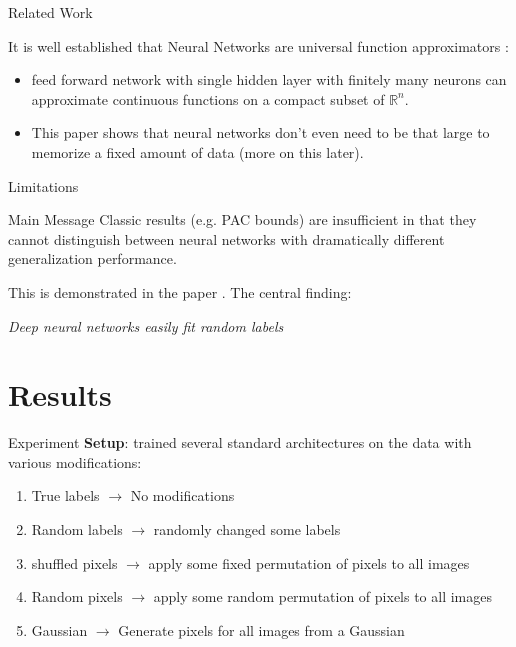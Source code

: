\documentclass[10pt]{beamer}
\begin{document}
\begin{frame}{Related Work}
	
	It is well established that Neural Networks are universal function approximators \cite{2017arXiv170605394A}:
	\begin{itemize}
		\item feed forward network with single hidden layer with finitely many neurons can approximate continuous functions on a compact subset of $\mathbb{R}^n$.
		\item This paper shows that neural networks don't even need to be that large to memorize a fixed amount of data (more on this later).
	\end{itemize}
	
\end{frame}

\begin{frame}{Limitations}
\begin{alertblock}{Main Message}
	Classic results (e.g. PAC bounds) are insufficient in that they cannot distinguish between neural networks with dramatically different generalization performance.
\end{alertblock}

This is demonstrated in the paper \cite{DBLP:journals/corr/ZhangBHRV16}. The central finding:

\begin{center}
	\emph{Deep neural networks easily fit random labels}
\end{center}

\end{frame}	

\section{Results}

\begin{frame}{Experiment}
	\textbf{Setup}: trained several standard architectures on the data with various modifications:
	\begin{enumerate}
		\item True labels $\rightarrow$ No modifications
		\item Random labels $\rightarrow$ randomly changed some labels
		\item shuffled pixels $\rightarrow$ apply some fixed permutation of pixels to all images
		\item Random pixels $\rightarrow$ apply some random permutation of pixels to all images
		\item Gaussian $\rightarrow$ Generate pixels for all images from a Gaussian
	\end{enumerate}

\end{frame}
\end{document}
